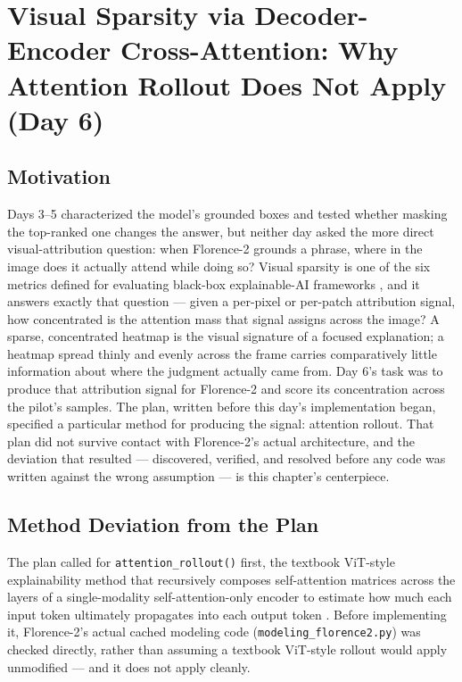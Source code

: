 \chapter{Visual Sparsity via Decoder-Encoder Cross-Attention: Why Attention Rollout Does Not Apply (Day 6)}
\label{chap:day06}

\section{Motivation}

Days 3--5 characterized the model's grounded boxes and tested whether masking the top-ranked one
changes the answer, but neither day asked the more direct visual-attribution question: when
Florence-2 grounds a phrase, where in the image does it actually attend while doing so? Visual
sparsity is one of the six metrics defined for evaluating black-box explainable-AI frameworks
\citep{arreche2024exai}, and it answers exactly that question --- given a per-pixel or per-patch
attribution signal, how concentrated is the attention mass that signal assigns across the image?
A sparse, concentrated heatmap is the visual signature of a focused explanation; a heatmap spread
thinly and evenly across the frame carries comparatively little information about where the
judgment actually came from. Day 6's task was to produce that attribution signal for Florence-2
and score its concentration across the pilot's samples. The plan, written before this day's
implementation began, specified a particular method for producing the signal: attention rollout.
That plan did not survive contact with Florence-2's actual architecture, and the deviation that
resulted --- discovered, verified, and resolved before any code was written against the wrong
assumption --- is this chapter's centerpiece.

\section{Method Deviation from the Plan}
\label{sec:day06-deviation}

The plan called for \texttt{attention\_rollout()} first, the textbook ViT-style explainability
method that recursively composes self-attention matrices across the layers of a single-modality
self-attention-only encoder to estimate how much each input token ultimately propagates into each
output token \citep{abnar2020rollout}. Before implementing it, Florence-2's actual cached modeling
code (\texttt{modeling\_florence2.py}) was checked directly, rather than assuming a textbook
ViT-style rollout would apply unmodified --- and it does not apply cleanly.

